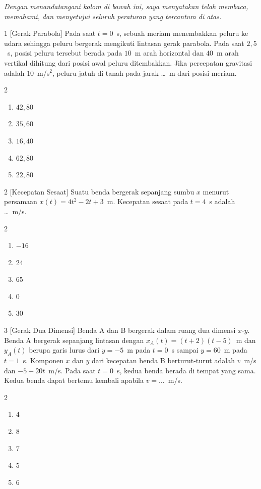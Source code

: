 \documentclass[11pt]{article}
\newenvironment{pilB}{%
  \par\smallskip\begin{multicols}{2}
  \begin{enumerate}[label=(\alph*),leftmargin=*,itemsep=1pt,topsep=3pt]}%
  {\end{enumerate}\end{multicols}}
\begin{document}
\vspace{0.6cm}
\noindent\textit{Dengan menandatangani kolom di bawah ini, saya menyatakan telah membaca,
memahami, dan menyetujui seluruh peraturan yang tercantum di atas.}

\vspace{0.6cm}
\noindent{}

\clearpage


\begin{soal}{1 \normalfont\small[Gerak Parabola]}
Pada saat $t=0$~s, sebuah meriam menembakkan peluru ke udara sehingga peluru bergerak
mengikuti lintasan gerak parabola. Pada saat $2{,}5$~s, posisi peluru tersebut berada pada
$10$~m arah horizontal dan $40$~m arah vertikal dihitung dari posisi awal peluru
ditembakkan. Jika percepatan gravitasi adalah $10$~m/s$^2$, peluru jatuh di tanah pada
jarak \ldots~m dari posisi meriam.
\begin{pilB}
  \item $42{,}80$ \item $35{,}60$ \item $16{,}40$ \item $62{,}80$ \item $22{,}80$
\end{pilB}
\end{soal}

\begin{soal}{2 \normalfont\small[Kecepatan Sesaat]}
Suatu benda bergerak sepanjang sumbu $x$ menurut persamaan $x(t)=4t^2-2t+3$~m.
Kecepatan sesaat pada $t=4$~s adalah \ldots~m/s.
\begin{pilB}
  \item $-16$ \item $24$ \item $65$ \item $0$ \item $30$
\end{pilB}
\end{soal}

\begin{soal}{3 \normalfont\small[Gerak Dua Dimensi]}
Benda A dan B bergerak dalam ruang dua dimensi $x$-$y$. Benda A bergerak sepanjang
lintasan dengan $x_A(t)=(t+2)(t-5)$~m dan $y_A(t)$ berupa garis lurus dari $y=-5$~m
pada $t=0$~s sampai $y=60$~m pada $t=1$~s. Komponen $x$ dan $y$ dari kecepatan benda B
berturut-turut adalah $v$~m/s dan $-5+20t$~m/s. Pada saat $t=0$~s, kedua benda berada di
tempat yang sama. Kedua benda dapat bertemu kembali apabila $v=\ldots$~m/s.
\begin{pilB}
  \item $4$ \item $8$ \item $7$ \item $5$ \item $6$
\end{pilB}
\end{soal}
\end{document}
